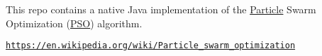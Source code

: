 This repo contains a native Java implementation of the \hyperlink{class_particle}{Particle} Swarm Optimization (\hyperlink{class_p_s_o}{P\+SO}) algorithm.

\href{https://en.wikipedia.org/wiki/Particle_swarm_optimization}{\tt https\+://en.\+wikipedia.\+org/wiki/\+Particle\+\_\+swarm\+\_\+optimization} 